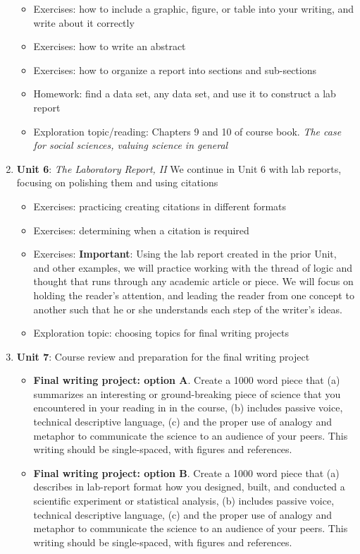 \documentclass[10pt]{article}
\begin{document}
\begin{enumerate}
\begin{itemize}
\item Exercises: how to include a graphic, figure, or table into your writing, and write about it correctly
\item Exercises: how to write an abstract
\item Exercises: how to organize a report into sections and sub-sections
\item Homework: find a data set, any data set, and use it to construct a lab report
\item Exploration topic/reading: Chapters 9 and 10 of course book.  \textit{The case for social sciences, valuing science in general}
\end{itemize}
\item \textbf{Unit 6}: \textit{The Laboratory Report, II} We continue in Unit 6 with lab reports, focusing on polishing them and using citations
\begin{itemize}
\item Exercises: practicing creating citations in different formats
\item Exercises: determining when a citation is required
\item Exercises: \textbf{Important}: Using the lab report created in the prior Unit, and other examples, we will practice working with the thread of logic and thought that runs through any academic article or piece.  We will focus on holding the reader's attention, and leading the reader from one concept to another such that he or she understands each step of the writer's ideas.
\item Exploration topic: choosing topics for final writing projects
\end{itemize}
\item \textbf{Unit 7}: Course review and preparation for the final writing project
\begin{itemize}
\item \textbf{Final writing project: option A}.  Create a 1000 word piece that (a) summarizes an interesting or ground-breaking piece of science that you encountered in your reading in in the course, (b) includes passive voice, technical descriptive language, (c) and the proper use of analogy and metaphor to communicate the science to an audience of your peers.  This writing should be single-spaced, with figures and references.
\item \textbf{Final writing project: option B}.  Create a 1000 word piece that (a) describes in lab-report format how you designed, built, and conducted a scientific experiment or statistical analysis, (b) includes passive voice, technical descriptive language, (c) and the proper use of analogy and metaphor to communicate the science to an audience of your peers.  This writing should be single-spaced, with figures and references.
\end{itemize}
\end{enumerate}
\end{document}
